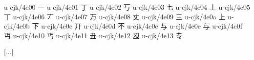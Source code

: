\begin{multicols}{2}\begingroup\mktsObeyAllLines{}

\begingroup\mktsStyleCode{}u-cjk/4e00	{\cjk{}一}	 
u-cjk/4e01	{\cjk{}丁}	 
u-cjk/4e02	{\cjk{}丂}	 
u-cjk/4e03	{\cjk{}七}	 
u-cjk/4e04	{\cjk{}丄}	 
u-cjk/4e05	{\cjk{}丅}	 
u-cjk/4e06	{\cjk{}丆}	 
u-cjk/4e07	{\cjk{}万}	 
u-cjk/4e08	{\cjk{}丈}	 
u-cjk/4e09	{\cjk{}三}	 
u-cjk/4e0a	{\cjk{}上}	 
u-cjk/4e0b	{\cjk{}下}	 
u-cjk/4e0c	{\cjk{}丌}	 
u-cjk/4e0d	{\cjk{}不}	 
u-cjk/4e0e	{\cjk{}与}	 
u-cjk/4e0e	{\cjk{}与}	 
u-cjk/4e0f	{\cjk{}丏}	 
u-cjk/4e10	{\cjk{}丐}	 
u-cjk/4e11	{\cjk{}丑}	 
u-cjk/4e12	{\cjk{}丒}	 
u-cjk/4e13	{\cjk{}专}	 
 
[...] 
 

\end{multicols}
